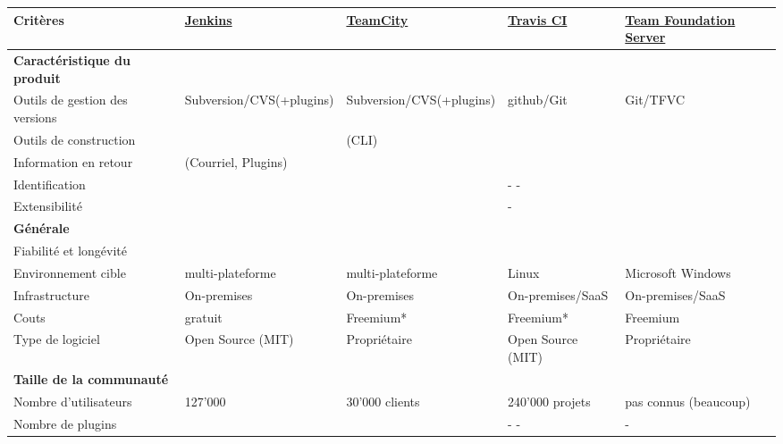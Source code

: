 \newpage
\begin{landscape}
\begin{table}[H]
	\centering
		\begin{tabular}{lp{4cm}p{4cm}p{4cm}p{4cm}} \toprule
			\textbf{Critères} & \href{https://jenkins-ci.org}{\textbf{Jenkins}} & \href{https://www.jetbrains.com/teamcity/}{\textbf{TeamCity}} & \href{https://travis-ci.org}{\textbf{Travis CI}} & \href{https://www.visualstudio.com/en-us/products/tfs-overview-vs.aspx}{\textbf{Team Foundation Server}} \\ \midrule
			\rowcolor{GrayRow}\textbf{Caractéristique du produit} &  &  &  &  \\ \midrule[0.16em]
			Outils de gestion des versions & Subversion/CVS(+plugins) & Subversion/CVS(+plugins) & github/Git & Git/TFVC \\ \midrule
			Outils de construction &  \checkmark & \checkmark\checkmark (CLI) & \checkmark & \checkmark \\ \midrule
			Information en retour & \checkmark (Courriel, Plugins) & \checkmark & \checkmark\checkmark & \checkmark\checkmark \\ \midrule
			Identification &  \checkmark\checkmark & \checkmark & - - &\checkmark\checkmark \\ \midrule
			Extensibilité & \checkmark\checkmark & \checkmark & - & \checkmark \\ \midrule
			\rowcolor{GrayRow}\textbf{Générale} &  &  &  &  \\ \midrule[0.16em]
			Fiabilité et longévité & \checkmark\checkmark & \checkmark\checkmark & \checkmark\checkmark & \checkmark\checkmark \\ \midrule
			Environnement cible & multi-plateforme & multi-plateforme & Linux & Microsoft Windows \\ \midrule
			Infrastructure & On-premises & On-premises & On-premises/SaaS & On-premises/SaaS \\ \midrule
			Couts & gratuit & Freemium* & Freemium* & Freemium \\ \midrule
			Type de logiciel & Open Source (MIT) & Propriétaire & Open Source (MIT) & Propriétaire \\ \midrule
			\rowcolor{GrayRow}\textbf{Taille de la communauté} & & & & \\ \midrule[0.16em]
			Nombre d'utilisateurs & 127'000 & 30'000 clients & 240'000 projets & pas connus (beaucoup) \\ \midrule
			Nombre de plugins & \checkmark\checkmark & \checkmark & - - & - \\ \midrule

\end{tabular}
\end{table}
\end{landscape}
